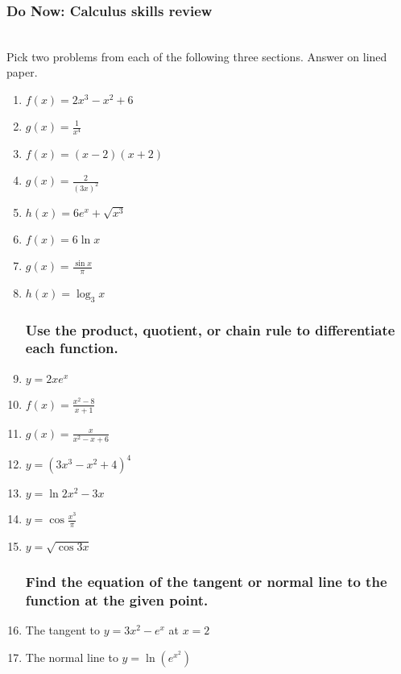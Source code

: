 \documentclass[12pt, twoside]{article}
\begin{document}
\subsubsection*{Do Now: Calculus skills review}\\
Pick two problems from each of the following three sections. Answer on lined paper.
\begin{enumerate}


\subsubsection*{Differentiate each function.}

  \item $f(x)=2x^3-x^2+6$
  \item $g(x) = \frac{1}{x^4}$
  \item $f(x)=(x-2)(x+2)$
  \item $g(x)=\frac{2}{(3x)^2}$
  \item $h(x)=6e^x+\sqrt{x^3}$
  \item $f(x)=6\ln{x}$
  \item $g(x) = \displaystyle \frac{\sin x}{\pi}$
  \item $h(x)= \log_3{x}$

\subsubsection*{Use the product, quotient, or chain rule to differentiate each function.}
  \item $y=2xe^x$
  \item $f(x)= \displaystyle \frac{x^2-8}{x+1}$
  \item $g(x) =\displaystyle \frac{x}{x^2-x+6}$
  \item $y = (3x^3-x^2+4)^4$
  \item $y= \ln{2x^2-3x}$
  \item $y= \displaystyle \cos{\frac{x^3}{\pi}}$
  \item $y = \sqrt{\cos{3x}}$

\subsubsection*{Find the equation of the tangent or normal line to the function at the given point.}
  \item The tangent to $y=3x^2-e^x$ at $x=2$
  \item The normal line to $\displaystyle y=\ln(e^{x^2})$


\end{enumerate}
\end{document}
